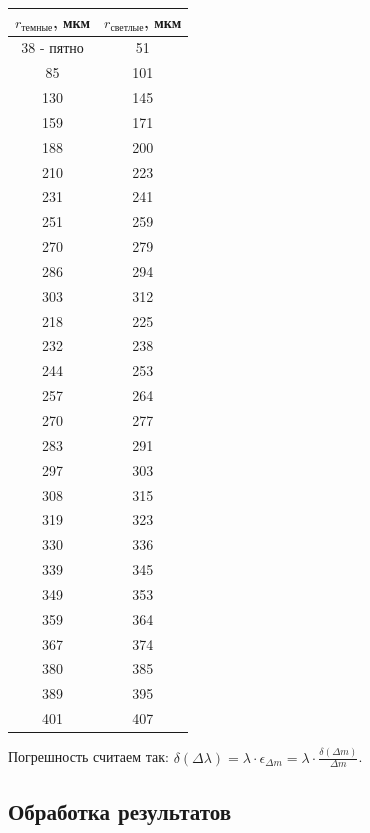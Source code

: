 \documentclass[a4paper,12pt]{extarticle}
\begin{document}
\begin{minipage}[t]{0.35\textwidth} 
    \begin{tabular}{|c|c|}
    \hline
     $r_{\text{темные}}$, мкм   &  $r_{\text{светлые}}$, мкм   \\ \hline
    38 - пятно & 51  \\ \hline
    85  & 101 \\ \hline
    130 & 145 \\ \hline
    159 & 171 \\ \hline
    188 & 200 \\ \hline
    210 & 223 \\ \hline
    231 & 241 \\ \hline
    251 & 259 \\ \hline
    270 & 279 \\ \hline
    286 & 294 \\ \hline
    303 & 312 \\ \hline
    218 & 225 \\ \hline
    232 & 238 \\ \hline
    244 & 253 \\ \hline
    257 & 264 \\ \hline
    270 & 277 \\ \hline
    283 & 291 \\ \hline
    297 & 303 \\ \hline
    308 & 315 \\ \hline
    319 & 323 \\ \hline
    330 & 336 \\ \hline
    339 & 345 \\ \hline
    349 & 353 \\ \hline
    359 & 364 \\ \hline
    367 & 374 \\ \hline
    380 & 385 \\ \hline
    389 & 395 \\ \hline
    401 & 407 \\ \hline
    \end{tabular}
\end{minipage}
Погрешность считаем так: $\delta(\Delta \lambda) = \lambda \cdot \epsilon_{\Delta m} = \lambda \cdot \frac{\delta(\Delta m)}{\Delta m}$.

\subsection*{Обработка результатов}
\end{document}

